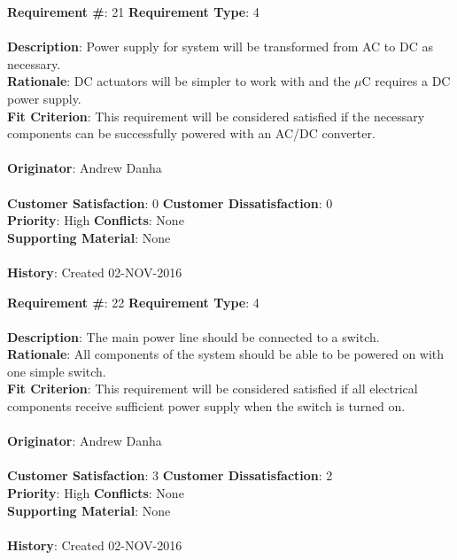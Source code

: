\documentclass[titlepage]{article}
\begin{document}
\begin{framed}
	\noindent\textbf{Requirement \#}: 21 \hfill \textbf{Requirement Type}: 4 \hfill\\\\
	\noindent\textbf{Description}: Power supply for system will be transformed from AC to DC as necessary.\\
	\textbf{Rationale}: DC actuators will be simpler to work with and the $\mu$C requires a DC power supply.\\
	\textbf{Fit Criterion}: This requirement will be considered satisfied if the necessary components can be successfully powered with an AC/DC converter.\\\\
	\textbf{Originator}: Andrew Danha\\\\ 
	\noindent\textbf{Customer Satisfaction}: 0 \hfill 	\textbf{Customer Dissatisfaction}: 0 \hfill\\
	\textbf{Priority}: High \hfill \textbf{Conflicts}: None \hfill\\
	\textbf{Supporting Material}: None\\\\
	\noindent\textbf{History}: Created 02-NOV-2016
\end{framed}

\begin{framed}
	\noindent\textbf{Requirement \#}: 22 \hfill \textbf{Requirement Type}: 4 \hfill\\\\
	\noindent\textbf{Description}: The main power line should be connected to a switch.\\
	\textbf{Rationale}: All components of the system should be able to be powered on with one simple switch.\\
	\textbf{Fit Criterion}: This requirement will be considered satisfied if all electrical components receive sufficient power supply when the switch is turned on.\\\\
	\textbf{Originator}: Andrew Danha\\\\ 
	\noindent\textbf{Customer Satisfaction}: 3 \hfill 	\textbf{Customer Dissatisfaction}: 2 \hfill\\
	\textbf{Priority}: High \hfill \textbf{Conflicts}: None \hfill\\
	\textbf{Supporting Material}: None\\\\
	\noindent\textbf{History}: Created 02-NOV-2016
\end{framed}
\end{document}
